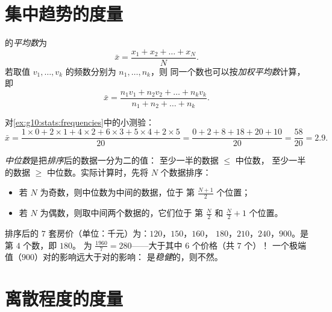 \section{集中趋势的度量}

\begin{definition}[平均数]\label{def:g10:stats:mean}
的\emph{平均数}为
\[
\bar x = \frac{x_1 + x_2 + \dots + x_N}{N}.
\]
若取值 $v_1, \dots, v_k$ 的频数分别为 $n_1, \dots, n_k$，则
同一个数也可以按\emph{加权平均数}计算，即
\[
\bar x = \frac{n_1 v_1 + n_2 v_2 + \dots + n_k v_k}{n_1 + n_2 + \dots + n_k}.
\]
\end{definition}

\begin{example}\label{ex:g10:stats:mean}
对\cref{ex:g10:stats:frequencies}中的小测验：
\[
\bar x = \frac{1 \times 0 + 2 \times 1 + 4 \times 2 + 6 \times 3
+ 5 \times 4 + 2 \times 5}{20}
= \frac{0 + 2 + 8 + 18 + 20 + 10}{20}
= \frac{58}{20} = 2.9 .
\]
\end{example}

\begin{definition}[中位数]\label{def:g10:stats:median}
\emph{中位数}是把\emph{排序}后的数据一分为二的值：
至少一半的数据 $\leq$ 中位数，
至少一半的数据 $\geq$ 中位数。实际计算时，先将 $N$ 个数据排序：
\begin{itemize}
  \item 若 $N$ 为奇数，则中位数为中间的数据，位于
        第 $\frac{N+1}{2}$ 个位置；
  \item 若 $N$ 为偶数，则取中间两个数据的，它们位于
        第 $\frac N2$ 和 $\frac N2 + 1$ 个位置。
\end{itemize}
\end{definition}

\begin{example}\label{ex:g10:stats:median}
排序后的 $7$ 套房价（单位：千元）为：$120$，$150$，$160$，
$180$，$210$，$240$，$900$。是第 $4$ 个数，即 $180$。
为 $\frac{1960}{7} = 280$——大于其中 $6$ 个价格（共 $7$ 个）！
一个极端值（$900$）对的影响远大于对的影响：
是\emph{稳健}的，则不然。
\end{example}

\section{离散程度的度量}

